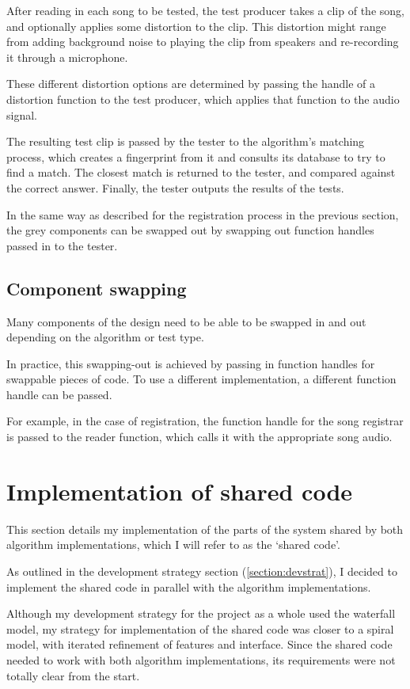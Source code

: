 \documentclass[12pt,a4paper,twoside,openright]{report}
\begin{document}
After reading in each song to be tested, the test producer takes a clip of the song, and optionally applies some distortion to the clip. This distortion might range from adding background noise to playing the clip from speakers and re-recording it through a microphone.

These different distortion options are determined by passing the handle of a distortion function to the test producer, which applies that function to the audio signal.

The resulting test clip is passed by the tester to the algorithm's matching process, which creates a fingerprint from it and consults its database to try to find a match. The closest match is returned to the tester, and compared against the correct answer. Finally, the tester outputs the results of the tests.

In the same way as described for the registration process in the previous section, the grey components can be swapped out by swapping out function handles passed in to the tester.


\subsection{Component swapping}

Many components of the design need to be able to be swapped in and out depending on the algorithm or test type. 

In practice, this swapping-out is achieved by passing in function handles for swappable pieces of code. To use a different implementation, a different function handle can be passed.

For example, in the case of registration, the function handle for the song registrar is passed to the reader function, which calls it with the appropriate song audio.


\section{Implementation of shared code}

This section details my implementation of the parts of the system shared by both algorithm implementations, which I will refer to as the `shared code'.

As outlined in the development strategy section (\ref{section:devstrat}), I decided to implement the shared code in parallel with the algorithm implementations.

Although my development strategy for the project as a whole used the waterfall model, my strategy for implementation of the shared code was closer to a spiral model, with iterated refinement of features and interface. Since the shared code needed to work with both algorithm implementations, its requirements were not totally clear from the start. 
\end{document}

